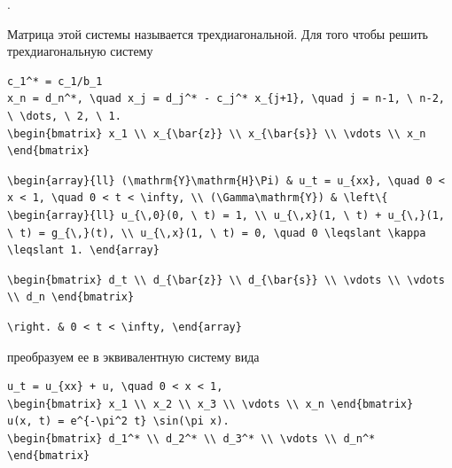 \documentclass[
  ukrainian,
]{article}
\begin{document}
.

Матрица этой системы называется трехдиагональной. Для того чтобы решить
трехдиагональную систему

\begin{verbatim}
c_1^* = c_1/b_1
x_n = d_n^*, \quad x_j = d_j^* - c_j^* x_{j+1}, \quad j = n-1, \ n-2, \ \dots, \ 2, \ 1.
\begin{bmatrix} x_1 \\ x_{\bar{z}} \\ x_{\bar{s}} \\ \vdots \\ x_n \end{bmatrix}
\end{verbatim}

\begin{verbatim}
\begin{array}{ll} (\mathrm{Y}\mathrm{H}\Pi) & u_t = u_{xx}, \quad 0 < x < 1, \quad 0 < t < \infty, \\ (\Gamma\mathrm{Y}) & \left\{ \begin{array}{ll} u_{\,0}(0, \ t) = 1, \\ u_{\,x}(1, \ t) + u_{\,}(1, \ t) = g_{\,}(t), \\ u_{\,x}(1, \ t) = 0, \quad 0 \leqslant \kappa \leqslant 1. \end{array}
\end{verbatim}

\begin{verbatim}
\begin{bmatrix} d_t \\ d_{\bar{z}} \\ d_{\bar{s}} \\ \vdots \\ \vdots \\ d_n \end{bmatrix}
\end{verbatim}

\begin{verbatim}
\right. & 0 < t < \infty, \end{array}
\end{verbatim}

преобразуем ее в эквивалентную систему вида

\begin{verbatim}
u_t = u_{xx} + u, \quad 0 < x < 1,
\begin{bmatrix} x_1 \\ x_2 \\ x_3 \\ \vdots \\ x_n \end{bmatrix}
u(x, t) = e^{-\pi^2 t} \sin(\pi x).
\begin{bmatrix} d_1^* \\ d_2^* \\ d_3^* \\ \vdots \\ d_n^* \end{bmatrix}
\end{verbatim}
\end{document}
